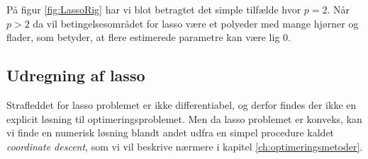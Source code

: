 På figur \ref{fig:LassoRig} har vi blot betragtet det simple tilfælde hvor $p=2$. 
Når \(p>2\) da vil betingelsesområdet for lasso være et polyeder med mange hjørner og flader, som betyder, at flere estimerede parametre kan være lig 0.
%
%
\subsection{Udregning af lasso} \label{subsec:udregning_lasso}
Strafleddet for lasso problemet er ikke differentiabel, og derfor findes der ikke en explicit løsning til optimeringsproblemet.
Men da lasso problemet er konveks, kan vi finde en numerisk løsning blandt andet udfra en simpel procedure kaldet \textit{coordinate descent}, som vi vil beskrive nærmere i kapitel \ref{ch:optimeringsmetoder}.

